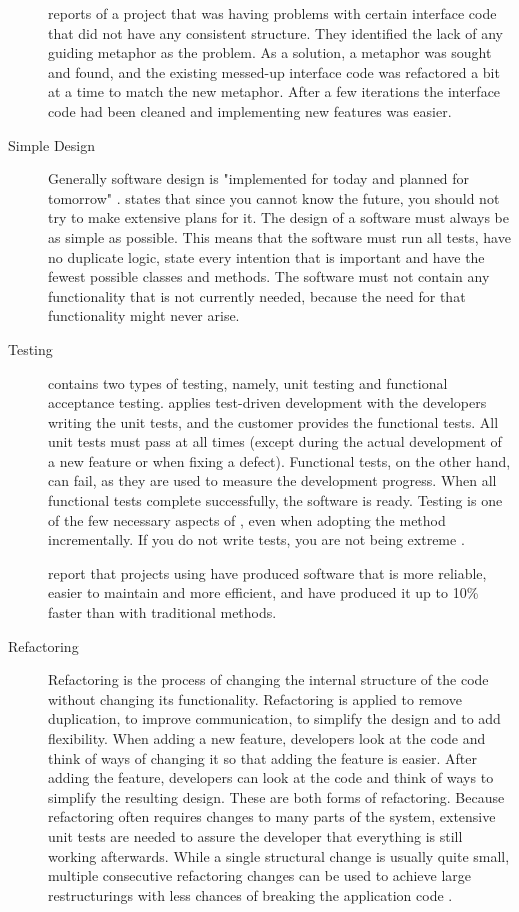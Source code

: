\begin{description}
\cite{agileadoption} reports of a project that was having problems 
with certain interface code that did not have any consistent 
structure. They identified the lack of any guiding metaphor as the 
problem. As a solution, a metaphor was sought and found, and the 
existing messed-up interface code was refactored a bit at a time to 
match the new metaphor. After a few iterations the interface code had 
been cleaned and implementing new features was easier.

\item[Simple Design] Generally software design is "implemented for 
today and planned for tomorrow" \citep{xpexplained}.  
states that since you cannot know the future, you should not try to 
make extensive plans for it. The design of a software must always be 
as simple as possible. This means that the software must run all 
tests, have no duplicate logic, state every intention that is 
important and have the fewest possible classes and methods. The 
software must not contain any functionality that is not currently 
needed, because the need for that functionality might never arise.

\item[Testing]  contains two types of testing, namely, unit 
testing and functional acceptance testing.  applies 
test-driven development with the developers writing the unit tests, 
and the customer provides the functional tests. All unit tests must 
pass at all times (except during the actual development of a new 
feature or when fixing a defect). Functional tests, on the other hand, 
can fail, as they are used to measure the development progress. When 
all functional tests complete successfully, the software is ready. 
Testing is one of the few necessary aspects of , even when 
adopting the method incrementally. If you do not write tests, you are 
not being extreme \citep{xpexplained}.

\cite{tddvswaterfall} report that projects using  have 
produced software that is more reliable, easier to maintain and more 
efficient, and have produced it up to 10\% faster than with 
traditional methods.

\item[Refactoring] Refactoring is the process of changing the internal 
structure of the code without changing its functionality. Refactoring 
is applied to remove duplication, to improve communication, to 
simplify the design and to add flexibility. When adding a new feature, 
developers look at the code and think of ways of changing it so that 
adding the feature is easier. After adding the feature, developers can 
look at the code and think of ways to simplify the resulting design. 
These are both forms of refactoring. Because refactoring often 
requires changes to many parts of the system, extensive unit tests are 
needed to assure the developer that everything is still working 
afterwards. While a single structural change is usually quite small, 
multiple consecutive refactoring changes can be used to achieve large 
restructurings with less chances of breaking the application code 
\citep{agilequality}.


\end{description}

